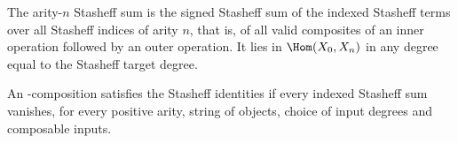 \begin{definition}
\label{AInfinityTheory.indexedStasheffSum}
\leanok
{}
The arity-$n$ Stasheff sum is the signed Stasheff sum of the indexed Stasheff terms
over all Stasheff indices of arity $n$, that is, of all valid composites of an inner
operation followed by an outer operation. It lies in $\Hom(X_0,X_n)$ in any degree
equal to the Stasheff target degree.
\end{definition}

\begin{definition}
\label{AInfinityTheory.IndexedSatisfiesStasheff}
\leanok
{}
An \Ainf{}-composition satisfies the Stasheff identities if every indexed
Stasheff sum vanishes, for every positive arity, string of objects, choice of
input degrees and composable inputs.
\end{definition}
